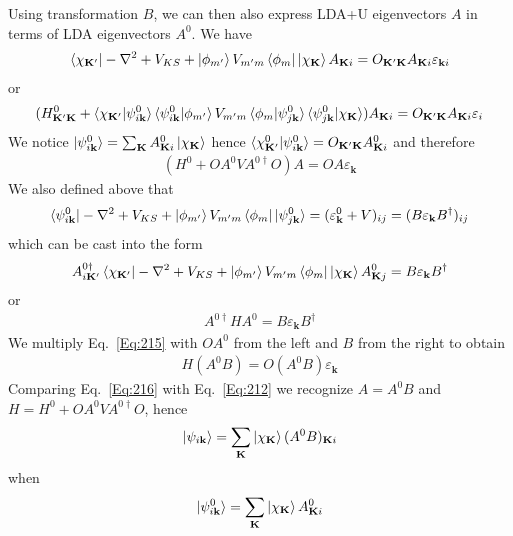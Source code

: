 \documentclass[aps,prb,floatfix,epsfig,singlecolumn,showpacs,preprintnumbers]{revtex4}
\newcommand{\vk}{{\mathbf{k}}}
\newcommand{\vK}{{\mathbf{K}}}
\begin{document}
Using transformation $B$, we can then also express LDA+U eigenvectors $A$ in terms of LDA
eigenvectors $A^0$.  We have
\begin{eqnarray}
\braket{\chi_{\vK'}|-\nabla^2 +  V_{KS}+\ket{\phi_{m'}}V_{m'm}\bra{\phi_{m}}|\chi_{\vK}} A_{\vK i}=O_{\vK'\vK}A_{\vK i}\varepsilon_{\vk i}
\end{eqnarray}
or
\begin{eqnarray}
(H^0_{\vK'\vK}+\braket{\chi_{\vK'}|\psi^0_{i\vk}}\braket{\psi^0_{i\vk}|\phi_{m'}}V_{m'm}\braket{\phi_m|\psi^0_{j\vk}}\braket{\psi^0_{j\vk}|\chi_{\vK}})
{A}_{\vK i}=O_{\vK'\vK}{A}_{\vK i}\varepsilon_i
\label{Eq:211}
\end{eqnarray}
We notice $\ket{\psi^0_{i\vk}}= \sum_{\vK}A^0_{\vK i}\ket{\chi_\vK}$ hence $\braket{\chi^0_{\vK'}|\psi^0_{i\vk}}=O_{\vK'\vK}A^0_{\vK i}$
and therefore 
\begin{eqnarray}
(H^0+O A^0 V A^{0\dagger} O){A} =O{A}\varepsilon_\vk
\label{Eq:212}
\end{eqnarray}
We also defined above that
\begin{eqnarray}
\braket{\psi^0_{i\vk}|-\nabla^2 +  V_{KS}+\ket{\phi_{m'}}V_{m'm}\bra{\phi_m}|\psi^0_{j\vk}}=(\varepsilon_\vk^0+V)_{ij}=(B \varepsilon_\vk B^\dagger)_{ij}
\end{eqnarray}
which can be cast into the form
\begin{eqnarray}
A^{0\dagger}_{i\vK'}\braket{\chi_{\vK'}|-\nabla^2 +  V_{KS}+\ket{\phi_{m'}}V_{m'm}\bra{\phi_m}|\chi_{\vK}}A^0_{\vK j}=B \varepsilon_\vk B^\dagger 
\end{eqnarray}
or
\begin{eqnarray}
A^{0\dagger} H A^0 = B\varepsilon_\vk B^\dagger
\label{Eq:215}
\end{eqnarray}
We multiply Eq.~\ref{Eq:215}  with $O A^0$ from the left and $B$ from the
right to obtain %
\begin{eqnarray}
H (A^0 B) = O (A^0 B) \varepsilon_\vk
\label{Eq:216}
\end{eqnarray}
Comparing Eq.~\ref{Eq:216} with Eq.~\ref{Eq:212} we recognize 
${A}=A^0 B$ and $H=H^0+O A^0 V A^{0\dagger} O$, hence
\begin{eqnarray}
\ket{\psi_{i\vk}} = \sum_\vK \ket{\chi_{\vK}} (A^0 B)_{\vK i}
\end{eqnarray}
when
\begin{eqnarray}
\ket{\psi^0_{i\vk}} = \sum_\vK \ket{\chi_{\vK}} A^0_{\vK i}
\end{eqnarray}
\end{document}

